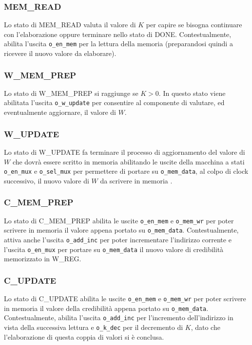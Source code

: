 \documentclass[10pt]{article}
\begin{document}
	\subsubsection{MEM\_READ}
	Lo stato di MEM\_READ valuta il valore di $K$ per capire se bisogna continuare con l'elaborazione oppure terminare nello stato di DONE. Contestualmente, abilita l'uscita \lstinline[style=vhdl]|o_en_mem| per la lettura della memoria (preparandosi quindi a ricevere il nuovo valore da elaborare).
	\subsubsection{W\_MEM\_PREP}
	Lo stato di W\_MEM\_PREP si raggiunge se $K > 0$.  In questo stato viene abilitata l'uscita \lstinline[style=vhdl]|o_w_update| per consentire al componente di valutare, ed eventualmente aggiornare, il valore di $W$.
	\subsubsection{W\_UPDATE}
	Lo stato di W\_UPDATE fa terminare il processo di aggiornamento del valore di $W$ che dovrà essere scritto in memoria abilitando le uscite della macchina a stati \lstinline[style=vhdl]|o_en_mux| e \lstinline[style=vhdl]|o_sel_mux|  per permettere di portare su \lstinline[style=vhdl]|o_mem_data|, al colpo di clock successivo, il nuovo valore di $W$ da scrivere in memoria .
	\subsubsection{C\_MEM\_PREP}
	Lo stato di C\_MEM\_PREP abilita le uscite \lstinline[style=vhdl]|o_en_mem| e \lstinline[style=vhdl]|o_mem_wr| per poter scrivere in memoria il valore appena portato su \lstinline[style=vhdl]|o_mem_data|. Contestualmente, attiva anche l'uscita \lstinline[style=vhdl]|o_add_inc| per poter incrementare l'indirizzo corrente e l'uscita \lstinline[style=vhdl]|o_en_mux| per portare su \lstinline[style=vhdl]|o_mem_data| il nuovo valore di credibilità memorizzato in W\_REG.
	\subsubsection{C\_UPDATE}
	Lo stato di C\_UPDATE abilita le uscite \lstinline[style=vhdl]|o_en_mem| e \lstinline[style=vhdl]|o_mem_wr| per poter scrivere in memoria il valore della credibilità appena portato su \lstinline[style=vhdl]|o_mem_data|. Contestualmente, abilita l'uscita \lstinline[style=vhdl]|o_add_inc| per l'incremento dell'indirizzo in vista della successiva lettura e \lstinline[style=vhdl]|o_k_dec| per il decremento di $K$, dato che l'elaborazione di questa coppia di valori si è conclusa.
\end{document}
